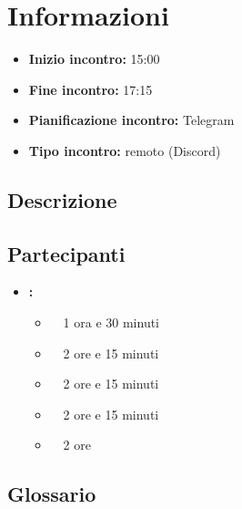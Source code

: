 \section{Informazioni}
\begin{itemize}
	\item \textbf{Inizio incontro:} 15:00
	\item \textbf{Fine incontro:} 17:15
	\item \textbf{Pianificazione incontro:} Telegram
	\item \textbf{Tipo incontro:} remoto (Discord)
\end{itemize}

\subsection{Descrizione}
\DocDescription

\subsection{Partecipanti}

\begin{itemize}
	\item \textbf{\GroupName:}
	\begin{itemize}
		\item \tommaso \ \rightarrow\ 1 ora e 30 minuti
		\item \marco \ \rightarrow\ 2 ore e 15 minuti
		\item \riccardo \ \rightarrow\ 2 ore e 15 minuti
		\item \raul \ \rightarrow\ 2 ore e 15 minuti
		\item \mattia \ \rightarrow\ 2 ore
	\end{itemize}
\end{itemize}

\subsection{Glossario}
\GlossarioIntroduzione

\clearpage